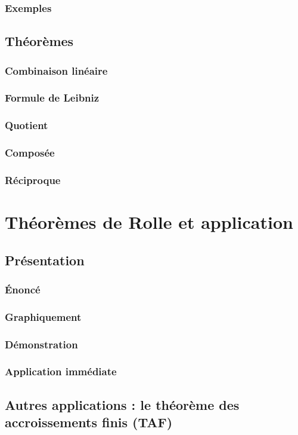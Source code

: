 \documentclass[12pt,a4paper,french]{book}
\begin{document}
			\subsubsection{Exemples}
		\subsection{Théorèmes}
			\subsubsection{Combinaison linéaire}
			\subsubsection{Formule de Leibniz}
			\subsubsection{Quotient}
			\subsubsection{Composée}
			\subsubsection{Réciproque}
	\section{Théorèmes de Rolle et application}
		\subsection{Présentation}
			\subsubsection{Énoncé}
			\subsubsection{Graphiquement}
			\subsubsection{Démonstration}
			\subsubsection{Application immédiate}
		\subsection{Autres applications : le théorème des accroissements finis (TAF)}
\end{document}
